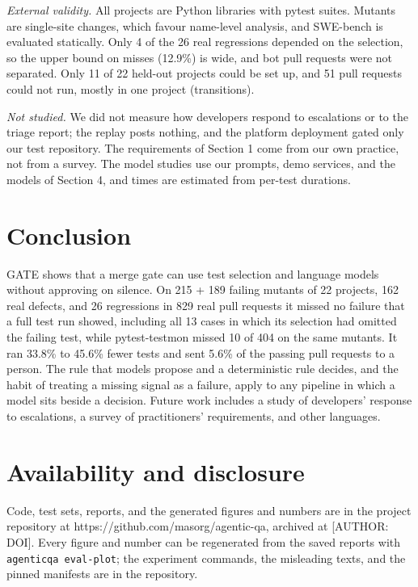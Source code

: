 \documentclass[conference]{IEEEtran}
\begin{document}
\emph{External validity.} All projects are Python libraries with pytest suites. Mutants are single-site changes, which favour name-level analysis, and SWE-bench is evaluated statically. Only 4 of the 26 real regressions depended on the selection, so the upper bound on misses (12.9\%) is wide, and bot pull requests were not separated. Only 11 of 22 held-out projects could be set up, and 51 pull requests could not run, mostly in one project (transitions).

\emph{Not studied.} We did not measure how developers respond to escalations or to the triage report; the replay posts nothing, and the platform deployment gated only our test repository. The requirements of Section 1 come from our own practice, not from a survey. The model studies use our prompts, demo services, and the models of Section 4, and times are estimated from per-test durations.

\section{Conclusion}\label{conclusion}

GATE shows that a merge gate can use test selection and language models without approving on silence. On 215 + 189 failing mutants of 22 projects, 162 real defects, and 26 regressions in 829 real pull requests it missed no failure that a full test run showed, including all 13 cases in which its selection had omitted the failing test, while pytest-testmon missed 10 of 404 on the same mutants. It ran 33.8\% to 45.6\% fewer tests and sent 5.6\% of the passing pull requests to a person. The rule that models propose and a deterministic rule decides, and the habit of treating a missing signal as a failure, apply to any pipeline in which a model sits beside a decision. Future work includes a study of developers' response to escalations, a survey of practitioners' requirements, and other languages.

\section*{Availability and disclosure}\label{availability-and-disclosure}

Code, test sets, reports, and the generated figures and numbers are in the project repository at https://github.com/masorg/agentic-qa, archived at {[}AUTHOR: DOI{]}. Every figure and number can be regenerated from the saved reports with \texttt{agenticqa\ eval-plot}; the experiment commands, the misleading texts, and the pinned manifests are in the repository.
\end{document}
